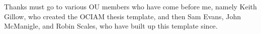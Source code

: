 Thanks must go to various \acrshort{OU} members who have come before me, namely Keith Gillow, who created the \acrshort{OCIAM} thesis template, and then Sam Evans, John McManigle, and Robin Scales, who have built up this template since.